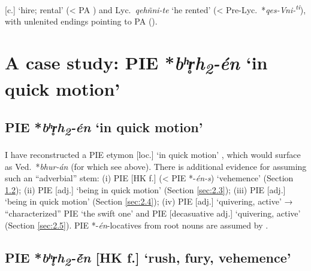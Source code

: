 \documentclass[output=paper,colorlinks,citecolor=brown]{langscibook}
\begin{document}
 [c.] ‘hire; rental’ (< PA ) and Lyc.\ \textit{qehñni-te}  ‘he rented’ (< Pre-Lyc.\ *\textit{qes-Vni-\textsuperscript{ti}}), with unlenited endings pointing to PA  (\citealt[166--167]{Sasseville2021}). 

\section{A case study: PIE *\textit{bʰr̥h\textsubscript{2}}\textit{-én} ‘in quick motion’}\label{sec:2}
\subsection{PIE *\textit{bʰr̥h\textsubscript{2}}\textit{-én} ‘in quick motion’} 
\label{sec:2.1}

I have reconstructed a PIE etymon  [loc.] ‘in quick motion’ \citep[9]{Garnier2022a}, which would surface as Ved.\ *\textit{bhur-án} (for which see above). There is additional evidence for assuming such an “adverbial” stem: (i) PIE  [HK f.] (< PIE *-\textit{én-s}) ‘vehemence’ (Section \ref{sec:2.2}); (ii) PIE  [adj.] ‘being in quick motion’ (Section \ref{sec:2.3}); (iii) PIE  [adj.] ‘being in quick motion’ (Section \ref{sec:2.4}); (iv) PIE  [adj.] ‘quivering, active’ → “characterized” PIE  ‘the swift one’ and PIE  [decasuative adj.]  ‘quivering, active’ (Section \ref{sec:2.5}). PIE *-\textit{én}-locatives  from root nouns are assumed by \citet[326--327]{Neri2017}.

\subsection{PIE *\textit{bʰr̥h\textsubscript{2}}\textit{-ḗn} [HK f.] ‘rush, fury, vehemence’} 
\label{sec:2.2}
\end{document}
